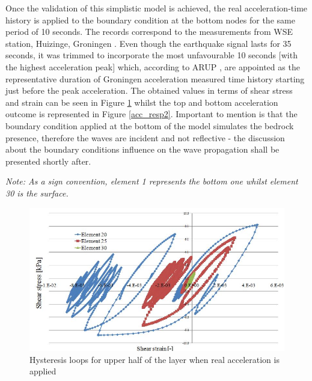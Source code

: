 	Once the validation of this simplistic model is achieved, the real acceleration-time history is applied to the boundary condition at the bottom nodes for the same period of 10 seconds. The records correspond to the measurements from WSE station, Huizinge, Groningen \cite{dost2013august}. Even though the earthquake signal lasts for 35 seconds, it was trimmed to incorporate the most unfavourable 10 seconds [with the highest acceleration peak] which, according to ARUP \cite{martellotta2015review}, are appointed as the representative duration of Groningen acceleration measured time history starting just before the peak acceleration. The obtained values in terms of shear stress and strain can be seen in Figure \ref{resp3} whilst the top and bottom acceleration outcome is represented in Figure \ref{acc_resp2}. Important to mention is that the boundary condition applied at the bottom of the model simulates the bedrock presence, therefore the waves are incident and not reflective - the discussion about the boundary conditions influence on the wave propagation shall be presented shortly after. 
	
	\textit{Note: As a sign convention, element 1 represents the bottom one whilst element 30 is the surface.}
	\begin{figure} [h!]
		\centering
		\includegraphics[width=0.7\linewidth]{"response3"}
		\caption{Hysteresis loops for upper half of the layer when real acceleration is applied}
		\label{resp3}
	\end{figure}
	
